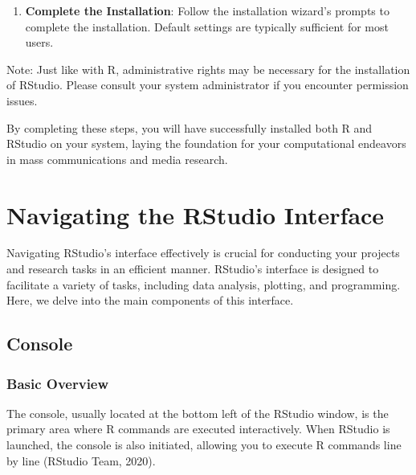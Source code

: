 \documentclass[
  b5paper]{book}
\newenvironment{Shaded}{\begin{snugshade}}{\end{snugshade}}
\newcommand{\NormalTok}[1]{#1}
\providecommand{\tightlist}{%
  \setlength{\itemsep}{0pt}\setlength{\parskip}{0pt}}
\begin{document}
\begin{enumerate}
\def\labelenumi{\arabic{enumi}.}
\setcounter{enumi}{3}
\tightlist
\item
  \textbf{Complete the Installation}: Follow the installation wizard's prompts to complete the installation. Default settings are typically sufficient for most users.
\end{enumerate}

\begin{Shaded}
\begin{Highlighting}[]
\NormalTok{Note: Just like with R, administrative rights may be necessary for the installation of RStudio. Please consult your system administrator if you encounter permission issues.}
\end{Highlighting}
\end{Shaded}

By completing these steps, you will have successfully installed both R and RStudio on your system, laying the foundation for your computational endeavors in mass communications and media research.

\hypertarget{navigating-the-rstudio-interface}{%
\section*{Navigating the RStudio Interface}\label{navigating-the-rstudio-interface}}

Navigating RStudio's interface effectively is crucial for conducting your projects and research tasks in an efficient manner. RStudio's interface is designed to facilitate a variety of tasks, including data analysis, plotting, and programming. Here, we delve into the main components of this interface.

\hypertarget{console}{%
\subsection*{Console}\label{console}}

\hypertarget{basic-overview}{%
\subsubsection*{Basic Overview}\label{basic-overview}}

The console, usually located at the bottom left of the RStudio window, is the primary area where R commands are executed interactively. When RStudio is launched, the console is also initiated, allowing you to execute R commands line by line (RStudio Team, 2020).
\end{document}
